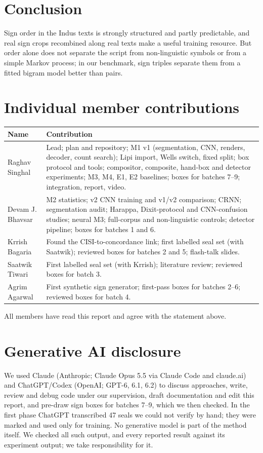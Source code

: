 \documentclass[11pt,a4paper,twocolumn]{article}
\begin{document}
\section{Conclusion}
Sign order in the Indus texts is strongly structured and partly predictable, and real sign crops recombined along real texts make a useful training resource. But order alone does not separate the script from non-linguistic symbols or from a simple Markov process; in our benchmark, sign triples separate them from a fitted bigram model better than pairs.

\section*{Individual member contributions}
{\footnotesize
\begin{tabularx}{\linewidth}{@{}l X@{}}
\toprule
Name & Contribution \\
\midrule
Raghav Singhal & Lead; plan and repository; M1 v1 (segmentation, CNN, renders, decoder, count search); Lipi import, Wells switch, fixed split; box protocol and tools; compositor, composite, hand-box and detector experiments; M3, M4, E1, E2 baselines; boxes for batches 7--9; integration, report, video. \\
Devam J. Bhavsar & M2 statistics; v2 CNN training and v1/v2 comparison; CRNN; segmentation audit; Harappa, Dixit-protocol and CNN-confusion studies; neural M3; full-corpus and non-linguistic controls; detector pipeline; boxes for batches 1 and 6. \\
Krrish Bagaria & Found the CISI-to-concordance link; first labelled seal set (with Saatwik); reviewed boxes for batches 2 and 5; flash-talk slides. \\
Saatwik Tiwari & First labelled seal set (with Krrish); literature review; reviewed boxes for batch 3. \\
Agrim Agarwal & First synthetic sign generator; first-pass boxes for batches 2--6; reviewed boxes for batch 4. \\
\bottomrule
\end{tabularx}}

\smallskip
\noindent All members have read this report and agree with the statement above.

\section*{Generative AI disclosure}
We used Claude (Anthropic; Claude Opus 5.5 via Claude Code and claude.ai) and ChatGPT/Codex (OpenAI; GPT-6, 6.1, 6.2) to discuss approaches, write, review and debug code under our supervision, draft documentation and edit this report, and pre-draw sign boxes for batches 7--9, which we then checked. In the first phase ChatGPT transcribed 47 seals we could not verify by hand; they were marked and used only for training. No generative model is part of the method itself. We checked all such output, and every reported result against its experiment output; we take responsibility for it.
\end{document}
